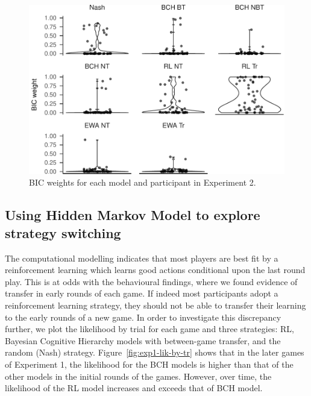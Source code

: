 \documentclass[
  english,
  man,floatsintext]{apa6}
\begin{document}
\begin{figure}

{\centering \includegraphics[width=\textwidth]{paper_draft_2021_files/figure-latex/xp2-BIC-weigths-1} 

}

\caption{BIC weights for each model and participant in Experiment 2.}\label{fig:xp2-BIC-weigths}
\end{figure}

\hypertarget{using-hidden-markov-model-to-explore-strategy-switching}{%
\subsection{Using Hidden Markov Model to explore strategy switching}\label{using-hidden-markov-model-to-explore-strategy-switching}}

The computational modelling indicates that most players are best fit by a reinforcement learning which learns good actions conditional upon the last round play. This is at odds with the behavioural findings, where we found evidence of transfer in early rounds of each game. If indeed most participants adopt a reinforcement learning strategy, they should not be able to transfer their learning to the early rounds of a new game. In order to investigate this discrepancy further, we plot the likelihood by trial for each game and three strategies: RL, Bayesian Cognitive Hierarchy models with between-game transfer, and the random (Nash) strategy. Figure~\ref{fig:exp1-lik-by-tr} shows that in the later games of Experiment 1, the likelihood for the BCH models is higher than that of the other models in the initial rounds of the games. However, over time, the likelihood of the RL model increases and exceeds that of BCH model.
\end{document}
